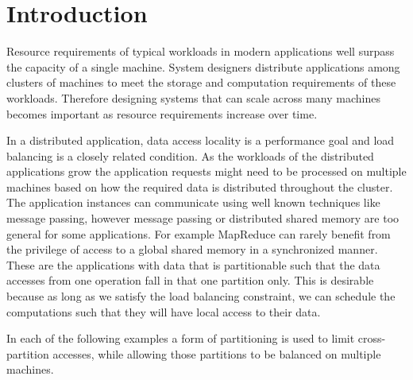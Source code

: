 \chapter{Introduction}
\label{chap:introduction}

Resource requirements of typical workloads in modern applications well surpass the
capacity of a single machine. System designers distribute applications among clusters of
machines to
meet the storage and computation requirements of these workloads. Therefore
designing systems that can scale across many machines becomes important as
resource requirements increase over time.

In a distributed application, data access locality is a performance goal
and load balancing is a closely related condition.
As the workloads of the distributed applications grow the application
requests might need to be processed on multiple machines based on how the 
required data is distributed throughout the cluster. The application instances
can communicate using well known techniques like message passing, however
message passing or
distributed shared memory are too general for some applications. For example
MapReduce \cite{dean2008mapreduce} can rarely benefit from the privilege of
access to a global
shared memory in a synchronized manner. These are the applications with
data that is partitionable such that the data accesses from one operation
fall in that one partition only. This is desirable because as long as we
satisfy the load balancing constraint, we can schedule the computations
such that they will have local access to their data.

In each of the following examples a form of partitioning is used to limit
cross-partition accesses, while allowing those partitions to be
balanced on multiple machines.

